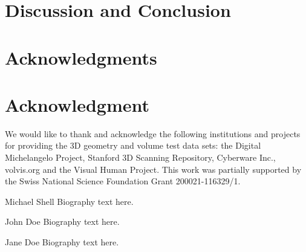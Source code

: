 \documentclass[10pt,journal,compsoc]{IEEEtran}
\begin{document}
\section{Discussion and Conclusion}
\label{SEC_conclusions}


\appendices
\ifCLASSOPTIONcompsoc
  \section*{Acknowledgments}
\else
  \section*{Acknowledgment}
\fi
We would like to thank and acknowledge the following institutions and projects
for providing the 3D geometry and volume test data sets: the Digital
Michelangelo Project, Stanford 3D Scanning Repository, Cyberware Inc.,
volvis.org and the Visual Human Project.  This work was partially supported by
the Swiss National Science Foundation Grant 200021-116329/1.


%

\begin{IEEEbiography}{Michael Shell}
Biography text here.
\end{IEEEbiography}

\begin{IEEEbiographynophoto}{John Doe}
Biography text here.
\end{IEEEbiographynophoto}


\begin{IEEEbiographynophoto}{Jane Doe}
Biography text here.
\end{IEEEbiographynophoto}




\end{document}
